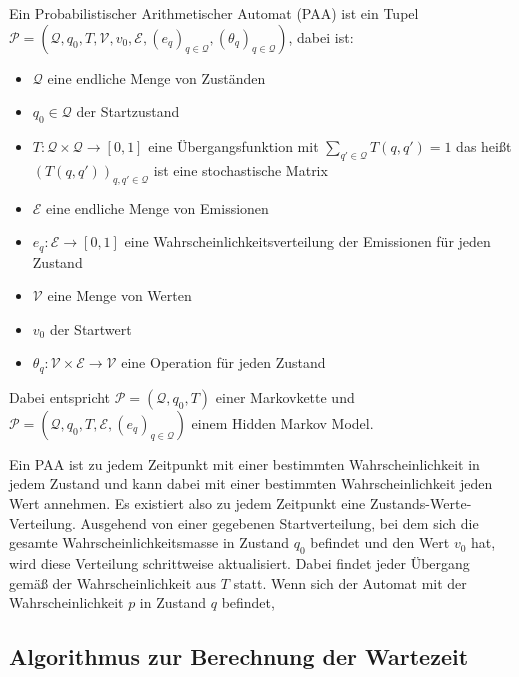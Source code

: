 \begin{definition}[PAA]
 Ein Probabilistischer Arithmetischer Automat (PAA) ist ein Tupel
 $ \mathcal{P} = (\mathcal{Q}, q_0, T, \mathcal{V}, v_0, \mathcal{E}, (e_q)_{q\in\mathcal{Q}}, (\theta_q)_{q\in\mathcal{Q}})$, dabei ist:
 \begin{itemize}
  \item $\mathcal{Q}$ eine endliche Menge von Zuständen
  \item $q_0 \in \mathcal{Q}$ der Startzustand
  \item $T: \mathcal{Q} \times \mathcal{Q} \rightarrow [0,1]$ eine Übergangsfunktion mit $\sum_{q' \in \mathcal{Q}} T(q, q') = 1 $ das heißt $(T(q,q'))_{q,q' \in \mathcal{Q}}$ ist eine stochastische Matrix
  \item $\mathcal{E}$ eine endliche Menge von Emissionen
  \item $e_q: \mathcal{E} \rightarrow [0,1]$ eine Wahrscheinlichkeitsverteilung der Emissionen für jeden Zustand
  \item $\mathcal{V}$ eine Menge von Werten
  \item $v_0$ der Startwert
  \item $\theta_q: \mathcal{V} \times \mathcal{E} \rightarrow \mathcal{V}$ eine Operation für jeden Zustand
 \end{itemize}
\end{definition}
Dabei entspricht $ \mathcal{P} = (\mathcal{Q}, q_0, T)$ einer Markovkette und $ \mathcal{P} = (\mathcal{Q}, q_0, T, \mathcal{E}, (e_q)_{q\in\mathcal{Q}})$ einem Hidden Markov Model. 

Ein PAA ist zu jedem Zeitpunkt mit einer bestimmten Wahrscheinlichkeit in jedem Zustand und kann dabei mit einer bestimmten Wahrscheinlichkeit jeden Wert annehmen. Es existiert also zu jedem Zeitpunkt eine Zustands-Werte-Verteilung. Ausgehend von einer gegebenen Startverteilung, bei dem sich die gesamte Wahrscheinlichkeitsmasse in Zustand $q_0$ befindet und den Wert $v_0$ hat, wird diese Verteilung schrittweise aktualisiert. Dabei findet jeder Übergang gemäß der Wahrscheinlichkeit aus $T$ statt. Wenn sich der Automat mit der Wahrscheinlichkeit $p$ in Zustand $q$ befindet, 
% 
% 
% 

\subsection{Algorithmus zur Berechnung der Wartezeit}
